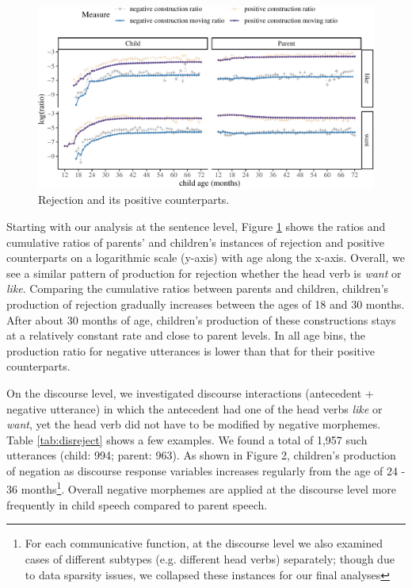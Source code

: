 \documentclass[
  english,
  man,floatsintext]{apa6}
\begin{document}
\begin{figure}[H]

{\centering \includegraphics{neg_construction_article_files/figure-latex/emotion-1} 

}

\caption{Rejection and its positive counterparts.}\label{fig:emotion}
\end{figure}

Starting with our analysis at the sentence level, Figure \ref{fig:emotion} shows the ratios and cumulative ratios of parents' and children's instances of rejection and positive counterparts on a logarithmic scale (y-axis) with age along the x-axis. Overall, we see a similar pattern of production for rejection whether the head verb is \emph{want} or \emph{like}. Comparing the cumulative ratios between parents and children, children's production of rejection gradually increases between the ages of 18 and 30 months. After about 30 months of age, children's production of these constructions stays at a relatively constant rate and close to parent levels. In all age bins, the production ratio for negative utterances is lower than that for their positive counterparts.

On the discourse level, we investigated discourse interactions (antecedent + negative utterance) in which the antecedent had one of the head verbs \emph{like} or \emph{want}, yet the head verb did not have to be modified by negative morphemes. Table \ref{tab:disreject} shows a few examples. We found a total of 1,957 such utterances (child: 994; parent: 963). As shown in Figure 2, children's production of negation as discourse response variables increases regularly from the age of 24 - 36 months\footnote{For each communicative function, at the discourse level we also examined cases of different subtypes (e.g. different head verbs) separately; though due to data sparsity issues, we collapsed these instances for our final analyses}. Overall negative morphemes are applied at the discourse level more frequently in child speech compared to parent speech.
\end{document}
